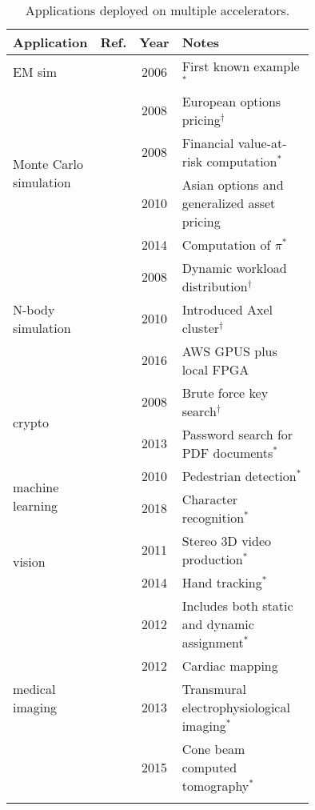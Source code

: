 \begin{table}[htp]
\centering
\caption{Applications deployed on multiple accelerators.}
\label{tbl:apps}
\vspace{0.1in}
\begin{tabular}{p{0.15\linewidth} | c | c | p{0.6\linewidth}}
Application & Ref. & Year & Notes \\ \hline
EM sim & \cite{kdh+06} & 2006 & First known example$^*$ \\ \hline
\multirow{4}{\linewidth}{Monte Carlo simulation} & \cite{ytt+08} & 2008 & European options pricing$^\dag$  \\ \cline{2-4}
 & \cite{shsc08} & 2008 & Financial value-at-risk computation$^*$  \\ \cline{2-4}
 & \cite{tttl10} & 2010 & Asian options and generalized asset pricing \\ \cline{2-4}
 & \cite{admb14} & 2014 & Computation of $\pi$$^*$ \\ \hline
\multirow{3}{\linewidth}{N-body simulation} & \cite{ytt+08} & 2008 & Dynamic workload distribution$^\dag$ \\ \cline{2-4}
 & \cite{tl10} & 2010 & Introduced Axel cluster$^\dag$ \\ \cline{2-4}
 & \cite{sm16} & 2016 & AWS GPUS plus local FPGA \\ \hline
\multirow{2}{\linewidth}{crypto} & \cite{ytt+08} & 2008 & Brute force key search$^\dag$ \\ \cline{2-4}
 & \cite{dfg+13} & 2013 & Password search for PDF documents$^*$ \\ \hline
\multirow{2}{\linewidth}{machine learning} & \cite{bkdb10} & 2010 & Pedestrian detection$^*$ \\ \cline{2-4}
 & \cite{log+18} & 2018 & Character recognition$^*$ \\ \hline
\multirow{2}{*}{vision} & \cite{ghgb11} & 2011 & Stereo 3D video production$^*$ \\ \cline{2-4}
 & \cite{brf14} & 2014 & Hand tracking$^*$ \\ \hline
\multirow{5}{\linewidth}{medical imaging} & \cite{szb+12} & 2012 & Includes both static and dynamic assignment$^*$ \\ \cline{2-4}
 & \cite{mjk12} & 2012 & Cardiac mapping \\ \cline{2-4}
 & \cite{sll13} & 2013 & Transmural electrophysiological imaging$^*$ \\ \cline{2-4}
 & \cite{rpm+15} & 2015 & Cone beam computed tomography$^*$ \\ \cline{2-4}
$$
\end{tabular}
\end{table}
